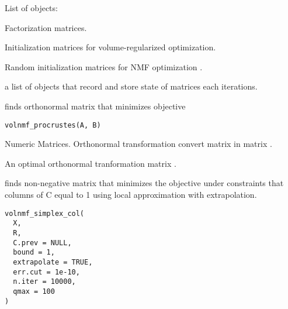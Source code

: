 \documentclass[letterpaper]{book}
\begin{document}
%
\begin{Value}
List of objects:

 Factorization matrices.

 Initialization matrices for volume-regularized optimization.

 Random initialization matrices for NMF optimization .

 a list of objects that record and store state of matrices each  iterations.
\end{Value}
%
\begin{Description}\relax
{} finds orthonormal matrix  that minimizes objective
\end{Description}
%
\begin{Usage}
\begin{verbatim}
volnmf_procrustes(A, B)
\end{verbatim}
\end{Usage}
%
\begin{Arguments}
\begin{ldescription}
\item[\code{A, B}] Numeric Matrices. Orthonormal transformation convert matrix  in matrix .
\end{ldescription}
\end{Arguments}
%
\begin{Value}
An optimal orthonormal tranformation matrix .
\end{Value}
%
\begin{Description}\relax
{} finds non-negative matrix  that minimizes the objective 
under constraints that columns of C equal to 1 using local approximation with extrapolation.
\end{Description}
%
\begin{Usage}
\begin{verbatim}
volnmf_simplex_col(
  X,
  R,
  C.prev = NULL,
  bound = 1,
  extrapolate = TRUE,
  err.cut = 1e-10,
  n.iter = 10000,
  qmax = 100
)
\end{verbatim}
\end{Usage}
\end{document}
